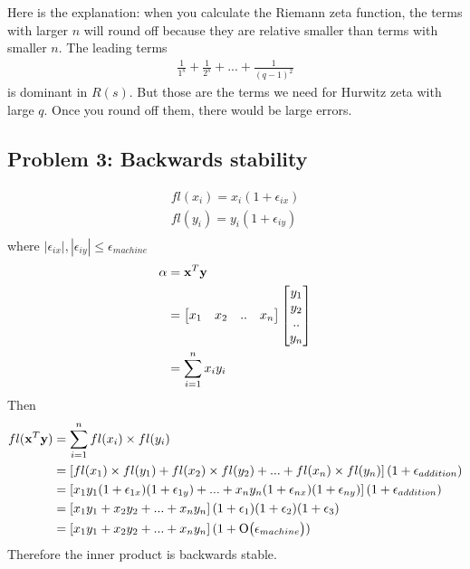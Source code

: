 \documentclass{article}
\newcommand{\BigO}[1]{\ensuremath{\operatorname{O}\bigl(#1\bigr)}}
\begin{document}
\begin{enumerate}
Here is the explanation:  when you calculate the Riemann zeta function,  the terms with larger $n$ will round off because they are relative smaller than terms with smaller $n$.  The leading terms
\begin{align*} 
\frac{1}{1^s} + \frac{1}{2^s} + ... +\frac{1}{(q-1)^2} 
\end{align*} 
is dominant in $R(s)$. But those are the terms we need for Hurwitz zeta with large $q$.  Once you round off them, there would be large errors. \\
\end{enumerate} 

\hypertarget{}{}
\subsection*{{Problem 3: Backwards stability}}
\label{}

\begin{align*}
fl(x_i) = x_i(1+\epsilon_{ix}) \\
fl(y_i) = y_i(1+\epsilon_{iy}) \\
\end{align*} 
where $|\epsilon_{ix}|, |\epsilon_{iy}|\leq\epsilon_{machine} $ \\
\begin{align*}
\alpha &=\boldsymbol{\mathrm{x}}^T\boldsymbol{\mathrm{y}} \\
& = \begin{bmatrix} x_1 & x_2 & .. & x_n \end{bmatrix}\begin{bmatrix} y_1 \\ y_2 \\ .. \\ y_n \end{bmatrix} \\
& = \sum_{i=1}^nx_i y_i \\ 
\end{align*} 
Then \begin{align*} 
fl(\vx^T\vy) & = \sum_{i=1}^nfl(x_i)\times fl( y_i) \\
& = \left[fl(x_1)\times fl(y_1)+ fl(x_2)\times fl(y_2) + ... + fl(x_n)\times fl(y_n)\right] (1+\epsilon_{addition})\\
& = \left[x_1y_1(1+\epsilon_{1x})(1+\epsilon_{1y}) + ... + x_ny_n(1+\epsilon_{nx})(1+\epsilon_{ny})\right](1+\epsilon_{addition}) \\ 
& = \left[x_1y_1 + x_2y_2 + ... +x_ny_n\right](1+\epsilon_1)(1+\epsilon_2)(1+\epsilon_3)\\
& = \left[x_1y_1 + x_2y_2 + ... +x_ny_n\right](1+\BigO{\epsilon_{machine}})
\end{align*}
Therefore the inner product is backwards stable. \\
\end{document}
